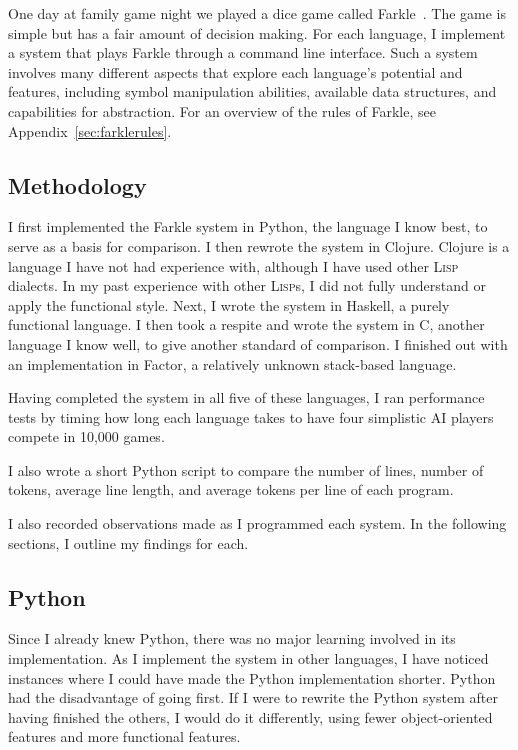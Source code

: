 \documentclass{article}
\begin{document}
One day at family game night we played a dice game called
Farkle~\cite{farklewikipedia}.  The game is simple but has a fair amount of
decision making.  For each language, I implement a system that plays Farkle
through a command line interface.  Such a system involves many different
aspects that explore each language's potential and features, including symbol
manipulation abilities, available data structures, and capabilities for
abstraction.  For an overview of the rules of Farkle, see
Appendix~\ref{sec:farklerules}.

\subsection{Methodology}

I first implemented the Farkle system in Python, the language I know best, to
serve as a basis for comparison.  I then rewrote the system in Clojure.  Clojure
is a language I have not had experience with, although I have used other
\textsc{Lisp} dialects.  In my past experience with other \textsc{Lisp}s, I did
not fully understand or apply the functional style.  Next, I wrote the system in
Haskell, a purely functional language.  I then took a respite and wrote the
system in C, another language I know well, to give another standard of
comparison.  I finished out with an implementation in Factor, a relatively
unknown stack-based language.

Having completed the system in all five of these languages, I ran performance
tests by timing how long each language takes to have four simplistic AI players
compete in 10,000 games.

I also wrote a short Python script to compare the number of lines, number of
tokens, average line length, and average tokens per line of each program.

I also recorded observations made as I programmed each system.  In the following
sections, I outline my findings for each.

\subsection{Python}

Since I already knew Python, there was no major learning involved in its
implementation.  As I implement the system in other languages, I have noticed
instances where I could have made the Python implementation shorter.  Python had
the disadvantage of going first.  If I were to rewrite the Python system after
having finished the others, I would do it differently, using fewer
object-oriented features and more functional features.
\end{document}
